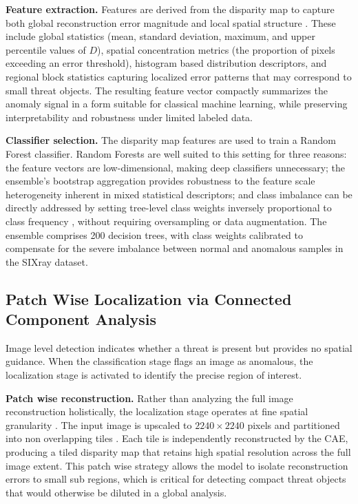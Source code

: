 \documentclass{bmvc2k}
\begin{document}
\textbf{Feature extraction.} Features are derived from the disparity map to capture both global reconstruction error magnitude and local spatial structure \cite{hassan2021unsupervised}. These include global statistics (mean, standard deviation, maximum, and upper percentile values of $D$), spatial concentration metrics (the proportion of pixels exceeding an error threshold), histogram based distribution descriptors, and regional block statistics capturing localized error patterns that may correspond to small threat objects. The resulting feature vector compactly summarizes the anomaly signal in a form suitable for classical machine learning, while preserving interpretability and robustness under limited labeled data.

\textbf{Classifier selection.} The disparity map features are used to train a Random Forest classifier. Random Forests are well suited to this setting for three reasons: the feature vectors are low-dimensional, making deep classifiers unnecessary; the ensemble's bootstrap aggregation provides robustness to the feature scale heterogeneity inherent in mixed statistical descriptors; and class imbalance can be directly addressed by setting tree-level class weights inversely proportional to class frequency \cite{baggage2022abdelfatah, sixray2019lingxi}, without requiring oversampling or data augmentation. The ensemble comprises 200 decision trees, with class weights calibrated to compensate for the severe imbalance between normal and anomalous samples in the SIXray dataset.

\subsection{Patch Wise Localization via Connected Component Analysis}

Image level detection indicates whether a threat is present but provides no spatial guidance. When the classification stage flags an image as anomalous, the localization stage is activated to identify the precise region of interest.

\textbf{Patch wise reconstruction.} Rather than analyzing the full image reconstruction holistically, the localization stage operates at fine spatial granularity \cite{patchae2023, yi2020patchsvdd}. The input image is upscaled to $2240\times2240$ pixels and partitioned into non overlapping tiles \cite{patchae2023}. Each tile is independently reconstructed by the CAE, producing a tiled disparity map that retains high spatial resolution across the full image extent. This patch wise strategy allows the model to isolate reconstruction errors to small sub regions, which is critical for detecting compact threat objects that would otherwise be diluted in a global analysis.
\end{document}
